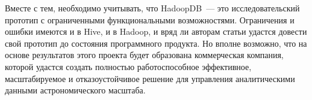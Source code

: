 Вместе с тем, необходимо учитывать, что HadoopDB~--- это исследовательский прототип с ограниченными функциональными 
возможностями. Ограничения и ошибки имеются и в Hive, и в Hadoop, и вряд ли авторам статьи удастся довести 
свой прототип до состояния программного продукта. Но вполне возможно, что на основе результатов этого проекта 
будет образована коммерческая компания, которой удастся создать полностью работоспособное эффективное, 
масштабируемое и отказоустойчивое решение для управления аналитическими данными астрономического масштаба.

